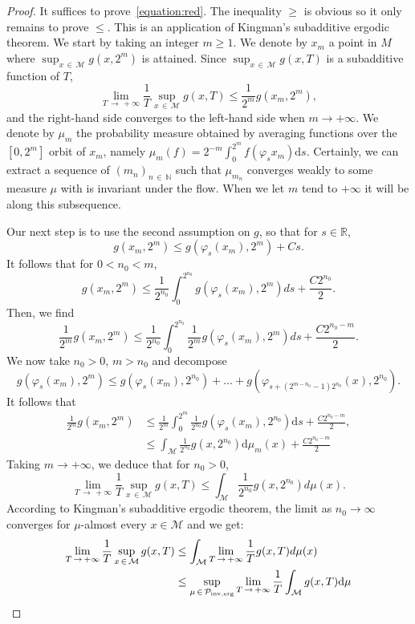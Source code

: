 \documentclass[10pt]{amsart}
\theoremstyle{definition}\newtheorem{defi}[theo]{Definition}\newtheorem{rema}[theo]{Remark}\newtheorem{exam}[theo]{Example}\newtheorem{exem}[theo]{Example}\newtheorem{nota}[theo]{Notation}
\newcommand{\R}{\mathbb{R}}
\newcommand{\N}{\mathbb{N}}
\newcommand{\mc}{\mathcal}
\newcommand{\M}{\mathcal{M}}
\newcommand{\dd}{\mathrm{d}}
\newcommand{\inverg}{\mathrm{inv,erg}}
\begin{document}
\begin{proof}
It suffices to prove~\eqref{equation:red}. The inequality $\geq$ is obvious so it only remains to prove $\leq$. This is an application of Kingman's subadditive ergodic theorem. We start by taking an integer $m \geq 1$. We denote by $x_m$ a point in $M$ where $\sup_{x\,\in\,\M} g(x, 2^m)$ is attained. Since $\sup_{x\,\in\,\M} g(x,T)$ is a subadditive function of $T$,
\[
\lim_{T\,\rightarrow\,+\infty} \frac{1}{T} \sup_{x\,\in\,\M} g(x,T) \leq \frac{1}{2^m} g\left(x_m, 2^m\right),
\]
and the right-hand side converges to the left-hand side when $m\to + \infty$. We denote by $\mu_m$ the probability measure obtained by averaging functions over the $[0,2^m]$ orbit of $x_m$, namely $\mu_m(f) = 2^{-m} \int_0^{2^m} f(\varphi_s x_m) \dd s$. Certainly, we can extract a sequence of $(m_n)_{n\,\in\,\N}$ such that $\mu_{m_n}$ converges weakly to some measure $\mu$ with is invariant under the flow. When we let $m$ tend to $+\infty$ it will be along this subsequence.

Our next step is to use the second assumption on $g$, so that for $s\in \R$,
\[
g\left(x_m, 2^m\right) \leq g\left(\varphi_s(x_m), 2^m\right) + C s.
\]
It follows that for $ 0 < n_0 < m$,
\[
g\left(x_m, 2^m\right) \leq \frac{1}{2^{n_0}} \int_0^{2^{n_0}} g\left(\varphi_s(x_m), 2^m\right) ds + \frac{C 2^{n_0}}{2}.
\]
Then, we find
\[
\frac{1}{2^m} g\left(x_m, 2^m\right) \leq \frac{1}{2^{n_0}} \int_0^{2^{n_0}} \frac{1}{2^m} g\left(\varphi_s(x_m), 2^m\right) ds + \frac{C 2^{n_0-m}}{2}.
\]
We now take $n_0>0$, $m> n_0$ and decompose
\[
g\left(\varphi_s(x_m), 2^m\right) \leq g\left(\varphi_s(x_m), 2^{n_0}\right) + \dots + g\left(\varphi_{s+\left(2^{m-n_0}-1\right)2^{n_0}}(x), 2^{n_0}\right).
\]
It follows that
\begin{align*}
\frac{1}{2^m} g\left(x_m, 2^m\right) &\leq \frac{1}{2^{m}} \int_0^{2^{m}} \frac{1}{2^{n_0}} g\left(\varphi_s(x_m), 2^{n_0}\right) \dd s + \frac{C 2^{n_0-m}}{2},\\
&\leq \int_{\M} \frac{1}{2^{n_0}} g\left(x, 2^{n_0}\right) \dd \mu_m(x) + \frac{C 2^{n_0-m}}{2}
\end{align*}
Taking $m\to + \infty$, we deduce that for $n_0>0$,
\[
\lim_{T\,\rightarrow\,+\infty} \frac{1}{T} \sup_{x\,\in\,\M} g(x,T) \leq \int_{\M} \frac{1}{2^{n_0}} g\left(x, 2^{n_0}\right) d\mu(x).
\]
According to Kingman's subadditive ergodic theorem, the limit as $n_0 \rightarrow \infty$ converges for $\mu$-almost every $x \in \M$ and we get:
\begin{align*}
\lim_{T\,\rightarrow\,+\infty} \frac{1}{T} \sup_{x\,\in\,\M} g(x,T) &\leq \int_{\M} \lim_{T\,\rightarrow\,+\infty} \frac{1}{T} g(x, T) d\mu(x) \\
&\leq \sup_{\mu\,\in\,\mc{P}_{\inverg}} \lim_{T\,\rightarrow\,+\infty} \frac{1}{T}\int_{\M} g(x,T) \dd\mu\qedhere
\end{align*}
\end{proof}
\end{document}
